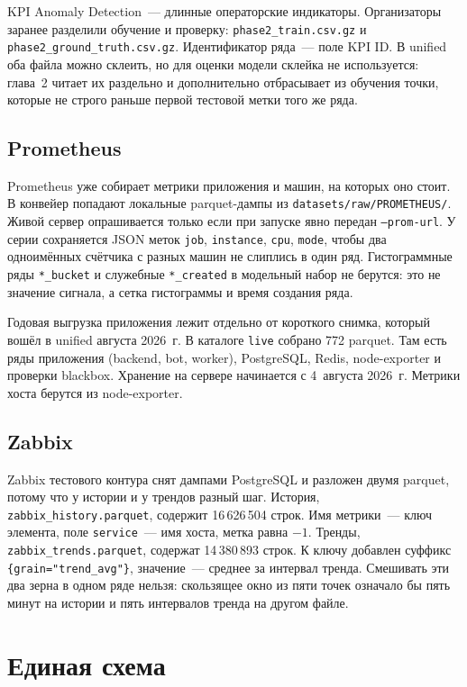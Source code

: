 KPI Anomaly Detection~--- длинные операторские индикаторы.
Организаторы заранее разделили обучение и проверку: \texttt{phase2\_train.csv.gz} и \texttt{phase2\_ground\_truth.csv.gz}.
Идентификатор ряда~--- поле KPI ID.
В unified оба файла можно склеить, но для оценки модели склейка не используется: глава~2 читает их раздельно и дополнительно отбрасывает из обучения точки, которые не строго раньше первой тестовой метки того же ряда.

\subsection{Prometheus}

Prometheus уже собирает метрики приложения и машин, на которых оно стоит.
В конвейер попадают локальные parquet-дампы из \texttt{datasets/raw/PROMETHEUS/}.
Живой сервер опрашивается только если при запуске явно передан \texttt{--prom-url}.
У серии сохраняется JSON меток \texttt{job}, \texttt{instance}, \texttt{cpu}, \texttt{mode}, чтобы два одноимённых счётчика с разных машин не слиплись в один ряд.
Гистограммные ряды \texttt{*\_bucket} и служебные \texttt{*\_created} в модельный набор не берутся: это не значение сигнала, а сетка гистограммы и время создания ряда.

Годовая выгрузка приложения лежит отдельно от короткого снимка, который вошёл в unified августа 2026~г.
В каталоге \texttt{live} собрано 772 parquet.
Там есть ряды приложения (backend, bot, worker), PostgreSQL, Redis, node-exporter и проверки blackbox.
Хранение на сервере начинается с 4~августа 2026~г.
Метрики хоста берутся из node-exporter.

\subsection{Zabbix}

Zabbix тестового контура снят дампами PostgreSQL и разложен двумя parquet, потому что у истории и у трендов разный шаг.
История, \texttt{zabbix\_history.parquet}, содержит 16\,626\,504 строк.
Имя метрики~--- ключ элемента, поле \texttt{service}~--- имя хоста, метка равна \(-1\).
Тренды, \texttt{zabbix\_trends.parquet}, содержат 14\,380\,893 строк.
К ключу добавлен суффикс \texttt{\{grain="trend\_avg"\}}, значение~--- среднее за интервал тренда.
Смешивать эти два зерна в одном ряде нельзя: скользящее окно из пяти точек означало бы пять минут на истории и пять интервалов тренда на другом файле.

\section{Единая схема}


